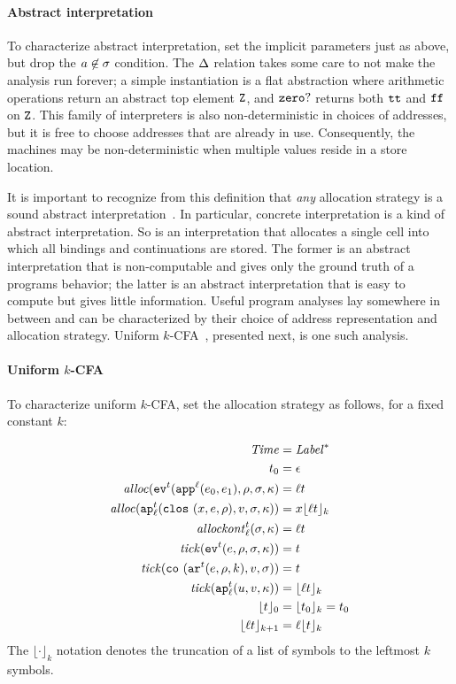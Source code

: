 \documentclass[preprint,onecolumn,9pt]{sigplanconf} %
\begin{document}
\paragraph{Abstract interpretation} To characterize abstract
interpretation, set the implicit parameters just as above, but drop
the $\maddr \not\in \msto$ condition. The $\interpdelta$ relation takes some care
to not make the analysis run forever; a simple instantiation is a flat
abstraction where arithmetic operations return an abstract top element
$\sNum$, and $\szerohuh$ returns both $\strue$ and $\sfalse$ on
$\sNum$.  This family of interpreters is also non-deterministic in
choices of addresses, but it is free to choose addresses that are
already in use.  Consequently, the machines may be non-deterministic
when multiple values reside in a store location.

It is important to recognize from this definition that \emph{any}
allocation strategy is a sound abstract
interpretation~\cite{dvanhorn:Might2009Posteriori}.  In particular,
concrete interpretation is a kind of abstract interpretation.  So is
an interpretation that allocates a single cell into which all bindings
and continuations are stored.  The former is an abstract
interpretation that is non-computable and gives only the ground truth
of a programs behavior; the latter is an abstract interpretation
that is easy to compute but gives little information.  Useful program
analyses lay somewhere in between and can be characterized by their
choice of address representation and allocation strategy.  Uniform
\(k\)-CFA~\cite{dvanhorn:nielson-nielson-popl97}, presented next, is one such analysis.

\paragraph{Uniform \(k\)-CFA} To characterize uniform \(k\)-CFA, set the allocation
strategy as follows, for a fixed constant \(k\):

{\small
\begin{align*}
\Counter &= \Label^* \\
\mtcntr &= \epsilon \\
\alloc(\ev[^\mcntr]{\sapp[^\mlab]{\mexpi0}{\mexpi1},\menv,\msto,\mkont} &= \mlab\mcntr \\
\alloc(\ap[^\mcntr_\mlab]{\clos{\mvar,\mexp,\menv},\mval,\msto,\mkont}) &= \mvar\kpush[_k]{\mlab\mcntr} \\
\allockont^\mcntr_\mlab(\msto,\mkont) &= \mlab\mcntr \\
\tick(\ev[^\mcntr]{\mexp,\menv,\msto,\mkont}) &= \mcntr \\
\tick(\co{\kar[^\mcntr]{\mexp,\menv,\mkaddr},\mval,\msto}) &= \mcntr \\
\tick(\ap[^\mcntr_\mlab]{\mvalx{u},\mval,\mkont}) &= \kpush[_k]{\mlab\mcntr} \\
  \kpush[_0]{\mcntr} &= \kpush[_k]{\mtcntr} = \mtcntr \\
  \kpush[_{k+1}]{\mlab\mcntr} &= \mlab\kpush[_k]{\mcntr} \\
\end{align*}}
The \(\lfloor\cdot\rfloor_k\) notation denotes the truncation of a list
of symbols to the leftmost \(k\) symbols.
\end{document}
